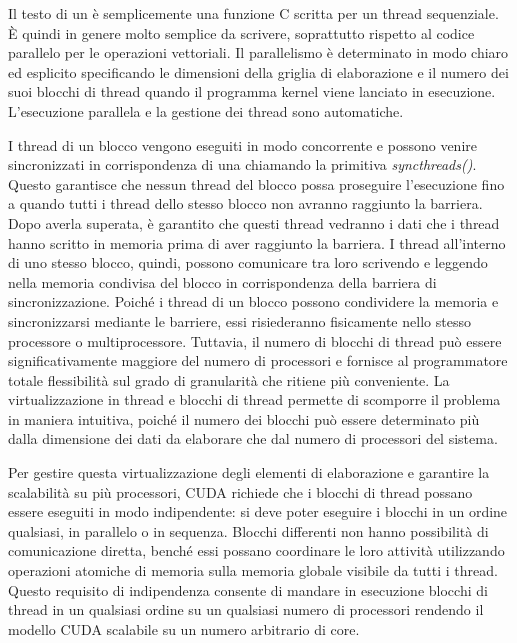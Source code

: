 Il testo di un  è semplicemente una funzione C scritta per un thread sequenziale. È quindi in genere molto semplice da scrivere, soprattutto rispetto al codice parallelo per le operazioni vettoriali. Il parallelismo è determinato in modo chiaro ed esplicito specificando le dimensioni  della griglia di elaborazione e il numero dei suoi blocchi di thread quando il programma kernel viene lanciato in esecuzione. L'esecuzione parallela e la gestione dei thread sono automatiche. 

I thread di un blocco vengono eseguiti in modo concorrente e possono venire sincronizzati in corrispondenza di una  chiamando la primitiva \textit{syncthreads()}. Questo garantisce che nessun thread del blocco possa proseguire l'esecuzione fino a quando tutti i thread dello stesso blocco non avranno raggiunto la barriera. Dopo averla superata, è garantito che questi thread vedranno i dati che i thread hanno scritto in memoria prima di aver raggiunto la barriera. I thread all'interno di uno stesso blocco, quindi, possono comunicare tra loro scrivendo e leggendo nella memoria condivisa del blocco in corrispondenza della barriera di sincronizzazione. Poiché i thread di un blocco possono condividere la memoria e sincronizzarsi mediante le barriere, essi risiederanno fisicamente nello stesso processore o multiprocessore. Tuttavia, il numero di blocchi di thread può essere significativamente maggiore del numero di processori e fornisce al programmatore totale flessibilità sul grado di granularità che ritiene più conveniente. La virtualizzazione in thread e blocchi di thread permette di scomporre il problema in maniera intuitiva, poiché il numero dei blocchi può essere determinato più dalla dimensione dei dati da elaborare che dal numero di processori del sistema.

Per gestire questa virtualizzazione degli elementi di elaborazione e garantire la scalabilità su più processori, CUDA richiede che i blocchi di thread possano essere eseguiti in modo indipendente: si deve poter eseguire i blocchi in un ordine qualsiasi, in parallelo o in sequenza. Blocchi differenti non hanno possibilità di comunicazione diretta, benché essi possano coordinare le loro attività utilizzando operazioni atomiche di memoria sulla memoria globale visibile da tutti i thread. Questo requisito di indipendenza consente di mandare in esecuzione blocchi di thread in un qualsiasi ordine su un qualsiasi numero di processori rendendo il modello CUDA scalabile su un numero arbitrario di core.

